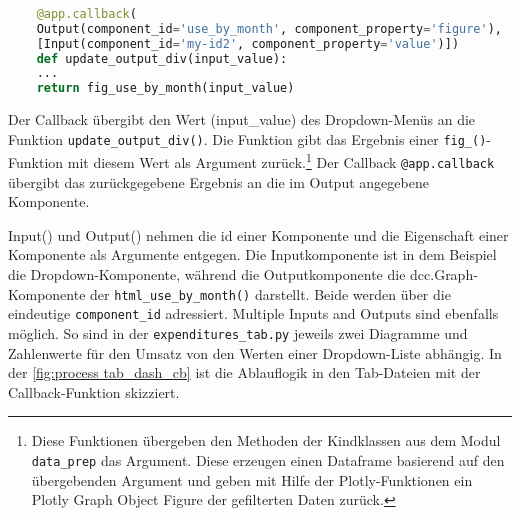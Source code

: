     \begin{lstlisting}[language=Python, caption={html\_fig\_total\_expnd()}]        
    
    @app.callback(
    Output(component_id='use_by_month', component_property='figure'),
    [Input(component_id='my-id2', component_property='value')])
    def update_output_div(input_value):
    ...
    return fig_use_by_month(input_value)
    \end{lstlisting}


 
    Der Callback übergibt den Wert (input\_value) des Dropdown-Menüs an die Funktion \texttt{update\_output\_div()}. 
    Die Funktion gibt das Ergebnis einer \texttt{fig\_()}-Funktion mit diesem Wert als Argument zurück.\footnote{ Diese Funktionen übergeben den Methoden der Kindklassen aus dem Modul \texttt{data\_prep} das Argument. 
    Diese erzeugen einen Dataframe basierend auf den übergebenden Argument und geben mit Hilfe der Plotly-Funktionen ein Plotly Graph Object Figure der gefilterten Daten zurück.}
    Der Callback \texttt{@app.callback} übergibt das zurückgegebene Ergebnis an die im Output angegebene Komponente.
    
    Input() und Output() nehmen die id einer Komponente und die Eigenschaft einer Komponente als Argumente entgegen.
    Die Inputkomponente ist in dem Beispiel die Dropdown-Komponente, während die Outputkomponente die dcc.Graph-Komponente der
    \texttt{html\_use\_by\_month()} darstellt. Beide werden über die eindeutige \texttt{component\_id} adressiert.
    Multiple Inputs and Outputs sind ebenfalls möglich. So sind in der \texttt{expenditures\_tab.py}
    jeweils zwei Diagramme und Zahlenwerte für den Umsatz von den Werten einer Dropdown-Liste abhängig.
    In der \autoref{fig:process tab_dash_cb} ist die Ablauflogik in den Tab-Dateien mit der Callback-Funktion skizziert.

